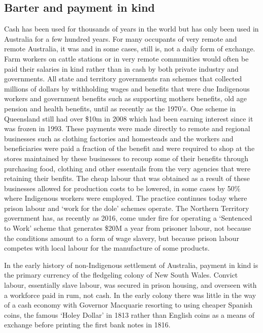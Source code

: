 \subsection{Barter and payment in kind}
Cash has been used for thousands of years in the world but has only been used in Australia for a few hundred years. For many occupants of very remote and remote Australia, it was and in some cases, still is, not a daily form of exchange. Farm workers on cattle stations or in very remote communities would often be paid their salaries in kind rather than in cash by both private industry and governments. All state and territory governments ran schemes that collected millions of dollars by withholding wages and benefits that were due Indigenous workers and government benefits such as supporting mothers benefits, old age pension and health benefits, until as recently as the 1970's\cite{RefWorks:284}. One scheme in Queensland still had over \$10m in 2008 which had been earning interest since it was frozen in 1993\cite{RefWorks:285}. These payments were made directly to remote and regional businesses such as clothing factories and homesteads and the workers and beneficiaries were paid a fraction of the benefit and were required to shop at the stores maintained by these businesses to recoup some of their benefits through purchasing food, clothing and other essentails from the very agencies that were retaining their benfits.  The cheap labour that was obtained as a result of these businesses allowed for production costs to be lowered, in some cases by 50\% where Indigenous workers were employed. The practice continues today where prison labour and `work for the dole' schemes operate. The Northern Territory government has, as recently as 2016, come under fire for operating a `Sentenced to Work' scheme that generates \$20M a year from prisoner labour, not because the conditions amount to a form of wage slavery, but because prison labour competes with local labour for the manufacture of some products\cite{RefWorks:286}.

In the early history of non-Indigenous settlement of Australia, payment in kind is the primary currency of the fledgeling colony of New South Wales. Convict labour, essentially slave labour, was secured in prison housing, and overseen with a workforce paid in rum, not cash. In the early colony there was little in the way of a cash economy with Governor Macquarie resorting to using cheaper Spanish coins, the famous `Holey Dollar' in 1813 rather than English coins as a means of exchange before printing the first bank notes in 1816\cite{RefWorks:287}.


